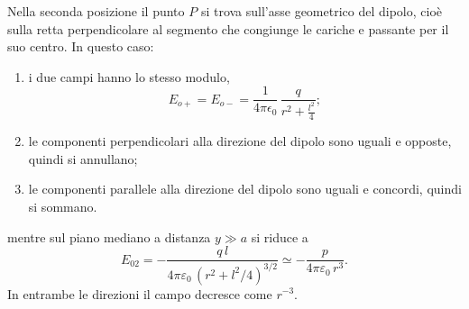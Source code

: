 \documentclass[11pt,a4paper]{article}
\newcommand{\epz}{\varepsilon_0}
\begin{document}
Nella seconda posizione il punto $P$ si trova sull'asse geometrico del dipolo, cioè sulla retta perpendicolare al segmento che congiunge le cariche e passante per il suo centro. In questo caso:
\begin{enumerate}
	\item[1)] i due campi hanno lo stesso modulo,
	\begin{equation}
		E_{o+}=E_{o-}=\frac{1}{4\pi\epsilon_{0}}\,\frac{q}{r^{2}+\frac{l^{2}}{4}};
	\end{equation}
	\item[2)] le componenti perpendicolari alla direzione del dipolo sono uguali e opposte, quindi si annullano;
	\item[3)] le componenti parallele alla direzione del dipolo sono uguali e concordi, quindi si sommano.
\end{enumerate}



mentre sul piano mediano a distanza $y\gg a$ si riduce a
\[
E_{02}=-\frac{q\,l}{4\pi\epz\,(r^2+l^2/4)^{3/2}}\simeq-\frac{p}{4\pi\epz\,r^3}.
\]
In entrambe le direzioni il campo decresce come $r^{-3}$.
\end{document}

